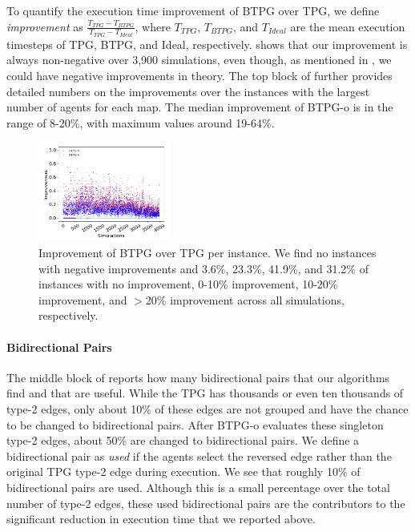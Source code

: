 \documentclass[letterpaper]{article} %
\theoremstyle{definition}
\begin{document}
To quantify the execution time improvement of BTPG over TPG, we define \emph{improvement} as $\frac{T_{TPG} - T_{BTPG}}{T_{TPG}-T_{Ideal}}$, where $T_{TPG}$, $T_{BTPG}$, and $T_{Ideal}$ are the mean execution timesteps of TPG, BTPG, and Ideal, respectively.  shows that our improvement is always non-negative over 3,900 simulations, even though, as mentioned in , we could have negative improvements in theory. The top block of  further provides detailed numbers on the improvements over the instances with the largest number of agents for each map. The median improvement of BTPG-o is in the range of 8-20\%, with maximum values around 19-64\%.


\begin{figure}[t!]
     \centering     
     \includegraphics[width=0.39\textwidth]{Figs/scatter.png}
     \caption{Improvement of BTPG over TPG per instance. We find no instances with negative improvements and 3.6\%, 23.3\%,  41.9\%, and 31.2\% of instances with no improvement, 0-10\% improvement, 10-20\% improvement, and $>$20\% improvement across all simulations, respectively.}
     \label{fig:scatter plot}
 \end{figure}
 
\paragraph{Bidirectional Pairs} The middle block of  reports how many bidirectional pairs that our algorithms find and that are useful. While the TPG has thousands or even ten thousands of type-2 edges, only about 10\% of these edges are not grouped and have the chance to be changed to bidirectional pairs. After BTPG-o evaluates these singleton type-2 edges, about 50\% are changed to bidirectional pairs. We define a bidirectional pair as \emph{used} if the agents select the reversed edge rather than the original TPG type-2 edge during execution. We see that roughly 10\% of bidirectional pairs are used. Although this is a small percentage over the total number of type-2 edges, these used bidirectional pairs are the contributors to the significant reduction in execution time that we reported above. 
\end{document}
